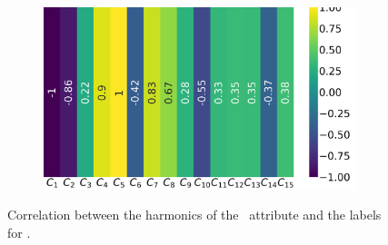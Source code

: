 \begin{figure}[!ht]
\begin{subfigure}{0.49\linewidth}
	\end{subfigure}
	\begin{subfigure}{0.49\linewidth}
		\includegraphics[width=\linewidth]{img/qlp_corr/Cnmod_coil3.png}
	\end{subfigure}
	\caption{Correlation between the harmonics of the \cnmod\ attribute and the labels for \qlp.}
	\label{fig:cnmod-lcorr-qlp}
\end{figure}

